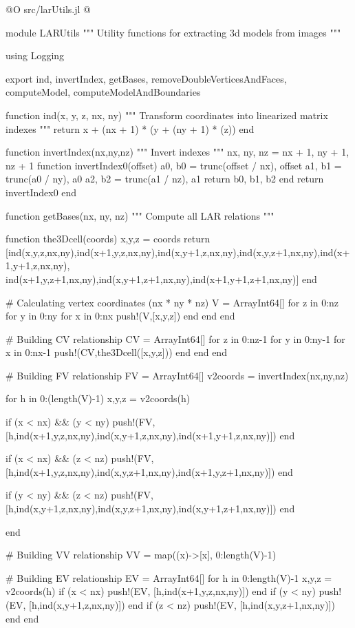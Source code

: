 \documentclass[11pt,oneside]{article}	%
\begin{document}
@O src/larUtils.jl
@{module LARUtils
"""
Utility functions for extracting 3d models from images
"""

using Logging

export ind, invertIndex, getBases, removeDoubleVerticesAndFaces, computeModel, computeModelAndBoundaries

function ind(x, y, z, nx, ny)
    """
    Transform coordinates into linearized matrix indexes
    """
    return x + (nx + 1) * (y + (ny + 1) * (z))
  end


function invertIndex(nx,ny,nz)
  """
  Invert indexes
  """
  nx, ny, nz = nx + 1, ny + 1, nz + 1
  function invertIndex0(offset)
      a0, b0 = trunc(offset / nx), offset %
      a1, b1 = trunc(a0 / ny), a0 %
      a2, b2 = trunc(a1 / nz), a1 %
      return b0, b1, b2
  end
  return invertIndex0
end


function getBases(nx, ny, nz)
  """
  Compute all LAR relations
  """

  function the3Dcell(coords)
    x,y,z = coords
    return [ind(x,y,z,nx,ny),ind(x+1,y,z,nx,ny),ind(x,y+1,z,nx,ny),ind(x,y,z+1,nx,ny),ind(x+1,y+1,z,nx,ny),
            ind(x+1,y,z+1,nx,ny),ind(x,y+1,z+1,nx,ny),ind(x+1,y+1,z+1,nx,ny)]
  end

  # Calculating vertex coordinates (nx * ny * nz)
  V = Array{Int64}[]
  for z in 0:nz
    for y in 0:ny
      for x in 0:nx
        push!(V,[x,y,z])
      end
    end
  end

  # Building CV relationship
  CV = Array{Int64}[]
  for z in 0:nz-1
    for y in 0:ny-1
      for x in 0:nx-1
        push!(CV,the3Dcell([x,y,z]))
      end
    end
  end

  # Building FV relationship
  FV = Array{Int64}[]
  v2coords = invertIndex(nx,ny,nz)

  for h in 0:(length(V)-1)
    x,y,z = v2coords(h)

    if (x < nx) && (y < ny)
      push!(FV, [h,ind(x+1,y,z,nx,ny),ind(x,y+1,z,nx,ny),ind(x+1,y+1,z,nx,ny)])
    end

    if (x < nx) && (z < nz)
      push!(FV, [h,ind(x+1,y,z,nx,ny),ind(x,y,z+1,nx,ny),ind(x+1,y,z+1,nx,ny)])
    end

    if (y < ny) && (z < nz)
      push!(FV,[h,ind(x,y+1,z,nx,ny),ind(x,y,z+1,nx,ny),ind(x,y+1,z+1,nx,ny)])
    end

  end

  # Building VV relationship
  VV = map((x)->[x], 0:length(V)-1)

  # Building EV relationship
  EV = Array{Int64}[]
  for h in 0:length(V)-1
    x,y,z = v2coords(h)
    if (x < nx)
      push!(EV, [h,ind(x+1,y,z,nx,ny)])
    end
    if (y < ny)
      push!(EV, [h,ind(x,y+1,z,nx,ny)])
    end
    if (z < nz)
      push!(EV, [h,ind(x,y,z+1,nx,ny)])
    end
  end

}
\end{document}
